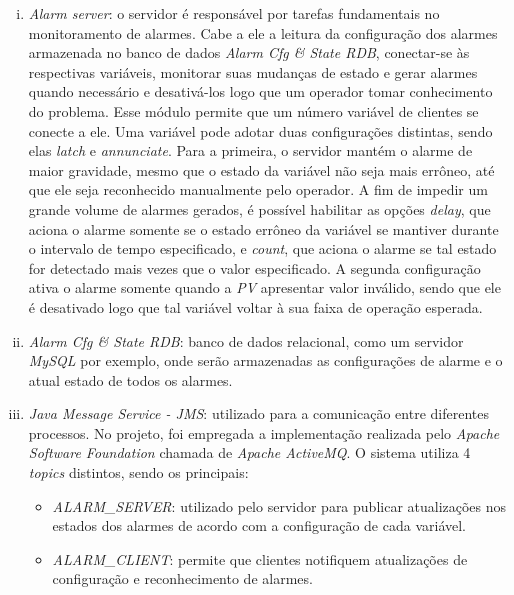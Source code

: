 \begin{enumerate}[i.]
  
  \item \textit{Alarm server}: o servidor é responsável por tarefas fundamentais
  no monitoramento de alarmes. Cabe a ele a leitura da configuração dos alarmes
  armazenada no banco de dados \textit{Alarm Cfg \& State RDB}, conectar-se às
  respectivas variáveis, monitorar suas mudanças de estado e gerar alarmes
  quando necessário e desativá-los logo que um operador tomar conhecimento
  do problema. Esse módulo permite que um número variável de clientes se conecte
  a ele. Uma variável pode adotar duas configurações distintas, sendo elas
  \textit{latch} e \textit{annunciate}. Para a primeira, o servidor mantém o
  alarme de maior gravidade, mesmo que o estado da variável não seja
  mais errôneo, até que ele seja reconhecido manualmente pelo operador.
  A fim de impedir um grande volume de alarmes gerados, é possível habilitar
  as opções \textit{delay}, que aciona o alarme somente se o estado errôneo da
  variável se mantiver durante o intervalo de tempo especificado, e
  \textit{count}, que aciona o alarme se tal estado for detectado mais vezes
  que o valor especificado. A segunda configuração ativa o alarme somente
  quando a \textit{PV} apresentar valor inválido, sendo que ele é desativado
  logo que tal variável voltar à sua faixa de operação esperada.
  
  \item \textit{Alarm Cfg \& State RDB}: banco de dados relacional, como um
  servidor \textit{MySQL} por exemplo, onde serão armazenadas as configurações
  de alarme e o atual estado de todos os alarmes.
  
  \item \textit{Java Message Service - JMS}: utilizado para a comunicação entre
  diferentes processos. No projeto, foi empregada a implementação realizada pelo
  \textit{Apache Software Foundation} chamada de  \textit{Apache ActiveMQ}. O
  sistema utiliza 4 \textit{topics} distintos, sendo os principais:
  
  \begin{itemize} \renewcommand\labelitemi{--}
    \item \textit{ALARM\_SERVER}: utilizado pelo servidor para publicar
    atualizações nos estados dos alarmes de acordo com a configuração de cada
    variável.
    
    \item \textit{ALARM\_CLIENT}: permite que clientes notifiquem atualizações
    de configuração e reconhecimento de alarmes.
    

\end{itemize}
\end{enumerate}
